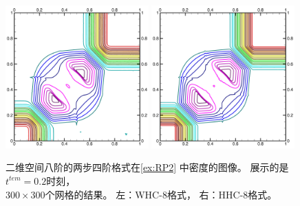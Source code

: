 \begin{figure}[htbp]
  \centering
  \includegraphics[width=0.49\textwidth]{fig/2D/RP14_S2O4-WHC8_CFL0.500000.pdf}
  \includegraphics[width=0.49\textwidth]{fig/2D/RP14_S2O4-HHC8theta200000_CFL0.500000.pdf}
  \caption{二维空间八阶的两步四阶格式在\cref{ex:RP2} 中密度的图像。
    展示的是$t^{tem}=0.2$时刻，
    \\$300 \times 300$个网格的结果。
    左：WHC-8格式，
    右：HHC-8格式。
  }
  \label{fig:RP2-8}
\end{figure}

